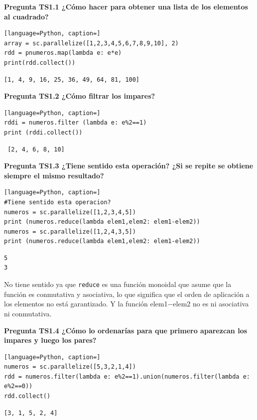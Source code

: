\documentclass[10pt,swedish, openany]{book}
\begin{document}
\textbf{Pregunta TS1.1 ¿Cómo hacer para obtener una lista de los elementos al cuadrado?}
\begin{lstlisting}[language=Python, caption=]
array = sc.parallelize([1,2,3,4,5,6,7,8,9,10], 2)
rdd = pnumeros.map(lambda e: e*e)
print(rdd.collect())
\end{lstlisting}
\begin{verbatim}
[1, 4, 9, 16, 25, 36, 49, 64, 81, 100]
\end{verbatim}

\vspace{0.8em}

\textbf{Pregunta TS1.2 ¿Cómo filtrar los impares?}
\begin{lstlisting}[language=Python, caption=]
rddi = numeros.filter (lambda e: e%2==1)
print (rddi.collect())
\end{lstlisting}
\begin{verbatim}
 [2, 4, 6, 8, 10]   
\end{verbatim}

\vspace{0.8em}

\textbf{Pregunta TS1.3 ¿Tiene sentido esta operación? ¿Si se repite se obtiene siempre el mismo resultado?}

\begin{lstlisting}[language=Python, caption=]
#Tiene sentido esta operacion?
numeros = sc.parallelize([1,2,3,4,5])
print (numeros.reduce(lambda elem1,elem2: elem1-elem2))
numeros = sc.parallelize([1,2,4,3,5])
print (numeros.reduce(lambda elem1,elem2: elem1-elem2))
\end{lstlisting}
\begin{verbatim}
5
3
\end{verbatim}
No tiene sentido ya que \texttt{reduce} es una función monoidal que asume que la función es conmutativa y asociativa, lo que significa que el orden de aplicación a los elementos no está garantizado. Y la función elem1$-$elem2 no es ni asociativa ni conmutativa.

\vspace{0.8em}

\textbf{Pregunta TS1.4 ¿Cómo lo ordenarías para que primero aparezcan los impares y luego los pares?}

\begin{lstlisting}[language=Python, caption=]
numeros = sc.parallelize([5,3,2,1,4])
rdd = numeros.filter(lambda e: e%2==1).union(numeros.filter(lambda e: e%2==0))
rdd.collect()
\end{lstlisting}
\begin{verbatim}
[3, 1, 5, 2, 4]
\end{verbatim}
\end{document}
